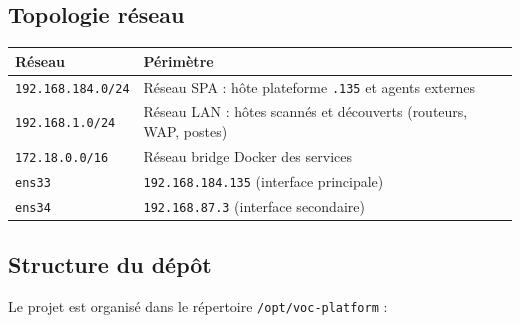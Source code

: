 \subsection{Topologie r\'eseau}

\begin{center}
\small
\begin{tabularx}{\linewidth}{@{}l X@{}}
\toprule
\textbf{R\'eseau} & \textbf{P\'erim\`etre} \\
\midrule
\texttt{192.168.184.0/24} & R\'eseau SPA : h\^ote plateforme \texttt{.135} et agents externes \\
\texttt{192.168.1.0/24} & R\'eseau LAN : h\^otes scann\'es et d\'ecouverts (routeurs, WAP, postes) \\
\texttt{172.18.0.0/16} & R\'eseau bridge Docker des services \\
\texttt{ens33} & \texttt{192.168.184.135} (interface principale) \\
\texttt{ens34} & \texttt{192.168.87.3} (interface secondaire) \\
\bottomrule
\end{tabularx}
\end{center}

\subsection{Structure du d\'ep\^ot}

Le projet est organis\'e dans le r\'epertoire \texttt{/opt/voc-platform} :

